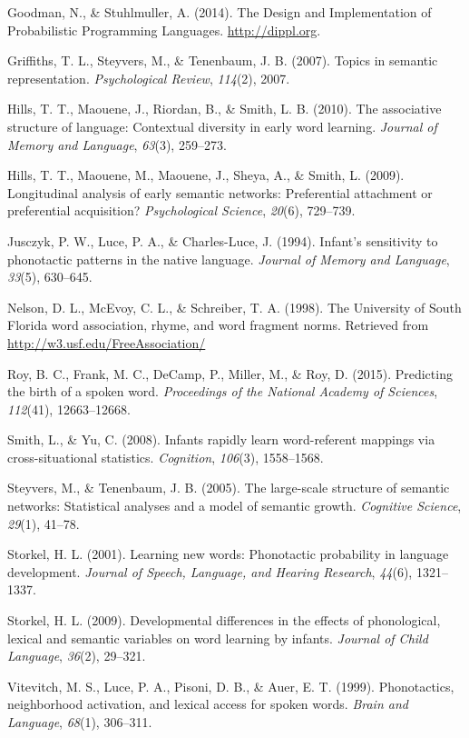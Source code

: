 \documentclass[10pt, letterpaper]{article}
\begin{document}
\hypertarget{ref-dippl}{}
Goodman, N., \& Stuhlmuller, A. (2014). The Design and Implementation of
Probabilistic Programming Languages. \url{http://dippl.org}.

\hypertarget{ref-griffiths07}{}
Griffiths, T. L., Steyvers, M., \& Tenenbaum, J. B. (2007). Topics in
semantic representation. \emph{Psychological Review}, \emph{114}(2),
2007.

\hypertarget{ref-hills2010}{}
Hills, T. T., Maouene, J., Riordan, B., \& Smith, L. B. (2010). The
associative structure of language: Contextual diversity in early word
learning. \emph{Journal of Memory and Language}, \emph{63}(3), 259--273.

\hypertarget{ref-hills2009}{}
Hills, T. T., Maouene, M., Maouene, J., Sheya, A., \& Smith, L. (2009).
Longitudinal analysis of early semantic networks: Preferential
attachment or preferential acquisition? \emph{Psychological Science},
\emph{20}(6), 729--739.

\hypertarget{ref-jusczyk1994}{}
Jusczyk, P. W., Luce, P. A., \& Charles-Luce, J. (1994). Infant's
sensitivity to phonotactic patterns in the native language.
\emph{Journal of Memory and Language}, \emph{33}(5), 630--645.

\hypertarget{ref-nelson1998}{}
Nelson, D. L., McEvoy, C. L., \& Schreiber, T. A. (1998). The University
of South Florida word association, rhyme, and word fragment norms.
Retrieved from \url{http://w3.usf.edu/FreeAssociation/}

\hypertarget{ref-roy2015}{}
Roy, B. C., Frank, M. C., DeCamp, P., Miller, M., \& Roy, D. (2015).
Predicting the birth of a spoken word. \emph{Proceedings of the National
Academy of Sciences}, \emph{112}(41), 12663--12668.

\hypertarget{ref-smith2008}{}
Smith, L., \& Yu, C. (2008). Infants rapidly learn word-referent
mappings via cross-situational statistics. \emph{Cognition},
\emph{106}(3), 1558--1568.

\hypertarget{ref-steyvers2005}{}
Steyvers, M., \& Tenenbaum, J. B. (2005). The large-scale structure of
semantic networks: Statistical analyses and a model of semantic growth.
\emph{Cognitive Science}, \emph{29}(1), 41--78.

\hypertarget{ref-storkel2001}{}
Storkel, H. L. (2001). Learning new words: Phonotactic probability in
language development. \emph{Journal of Speech, Language, and Hearing
Research}, \emph{44}(6), 1321--1337.

\hypertarget{ref-storkel2009}{}
Storkel, H. L. (2009). Developmental differences in the effects of
phonological, lexical and semantic variables on word learning by
infants. \emph{Journal of Child Language}, \emph{36}(2), 29--321.

\hypertarget{ref-vitevitch1999}{}
Vitevitch, M. S., Luce, P. A., Pisoni, D. B., \& Auer, E. T. (1999).
Phonotactics, neighborhood activation, and lexical access for spoken
words. \emph{Brain and Language}, \emph{68}(1), 306--311.
\end{document}
